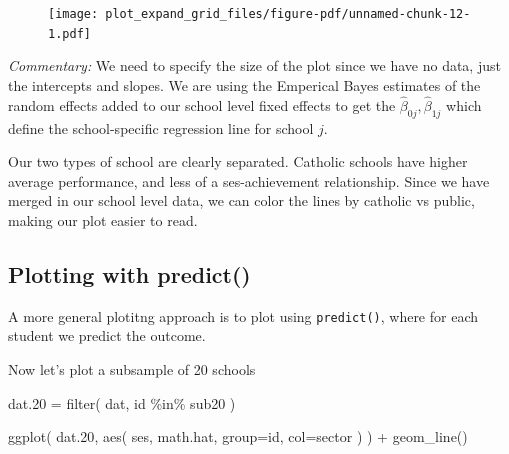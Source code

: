 \documentclass[
  letterpaper,
  DIV=11,
  numbers=noendperiod]{scrreprt}
\newenvironment{Shaded}{\begin{snugshade}}{\end{snugshade}}
\newcommand{\AttributeTok}[1]{\textcolor[rgb]{0.49,0.56,0.16}{#1}}
\newcommand{\FloatTok}[1]{\textcolor[rgb]{0.25,0.63,0.44}{#1}}
\newcommand{\FunctionTok}[1]{\textcolor[rgb]{0.02,0.16,0.49}{#1}}
\newcommand{\NormalTok}[1]{\textcolor[rgb]{0.00,0.44,0.13}{#1}}
\newcommand{\OtherTok}[1]{\textcolor[rgb]{0.00,0.44,0.13}{#1}}
\newcommand{\SpecialCharTok}[1]{\textcolor[rgb]{0.25,0.44,0.63}{#1}}
\begin{document}
\begin{figure}[H]

{\centering \texttt{[image: plot\_expand\_grid\_files/figure-pdf/unnamed-chunk-12-1.pdf]}

}

\end{figure}

\emph{Commentary:} We need to specify the size of the plot since we have
no data, just the intercepts and slopes. We are using the Emperical
Bayes estimates of the random effects added to our school level fixed
effects to get the \(\hat{\beta}_{0j}, \hat{\beta}_{1j}\) which define
the school-specific regression line for school \(j\).

Our two types of school are clearly separated. Catholic schools have
higher average performance, and less of a ses-achievement relationship.
Since we have merged in our school level data, we can color the lines by
catholic vs public, making our plot easier to read.

\hypertarget{plotting-with-predict}{%
\subsection{Plotting with predict()}\label{plotting-with-predict}}

A more general plotitng approach is to plot using \texttt{predict()},
where for each student we predict the outcome.

\begin{Shaded}
\end{Shaded}

Now let's plot a subsample of 20 schools

\begin{Shaded}
\begin{Highlighting}[]
\NormalTok{dat}\FloatTok{.20} \OtherTok{=} \FunctionTok{filter}\NormalTok{( dat, id }\SpecialCharTok{\%in\%}\NormalTok{ sub20 )}

\FunctionTok{ggplot}\NormalTok{( dat}\FloatTok{.20}\NormalTok{, }\FunctionTok{aes}\NormalTok{( ses, math.hat, }\AttributeTok{group=}\NormalTok{id, }\AttributeTok{col=}\NormalTok{sector ) ) }\SpecialCharTok{+}
  \FunctionTok{geom\_line}\NormalTok{()}
\end{Highlighting}
\end{Shaded}
\end{document}
